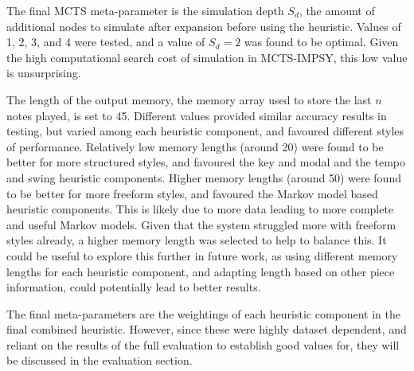 The final MCTS meta-parameter is the simulation depth $S_d$, the amount of additional nodes to simulate after expansion before using the heuristic. Values of 1, 2, 3, and 4 were tested, and a value of $S_d=2$ was found to be optimal. Given the high computational search cost of simulation in MCTS-IMPSY, this low value is unsurprising.

The length of the output memory, the memory array used to store the last $n$ notes played, is set to 45. Different values provided similar accuracy results in testing, but varied among each heuristic component, and favoured different styles of performance. Relatively low memory lengths (around 20) were found to be better for more structured styles, and favoured the key and modal and the tempo and swing heuristic components. Higher memory lengths (around 50) were found to be better for more freeform styles, and favoured the Markov model based heuristic components. This is likely due to more data leading to more complete and useful Markov models. Given that the system struggled more with freeform styles already, a higher memory length was selected to help to balance this. It could be useful to explore this further in future work, as using different memory lengths for each heuristic component, and adapting length based on other piece information, could potentially lead to better results.

The final meta-parameters are the weightings of each heuristic component in the final combined heuristic. However, since these were highly dataset dependent, and reliant on the results of the full evaluation to establish good values for, they will be discussed in the evaluation section.






